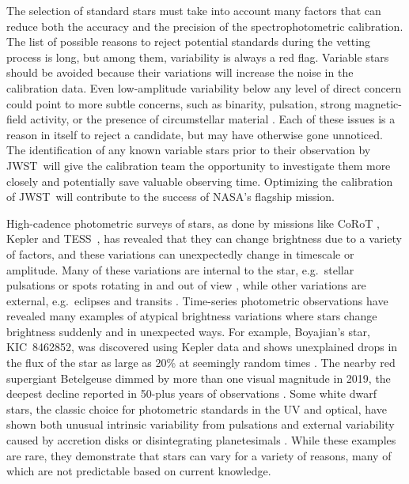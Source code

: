 \documentclass[twocolumn]{aastex631}
\newcommand{\webb}{JWST}
\newcommand{\tess}{TESS}
\begin{document}
The selection of standard stars must take into account many factors that can reduce both the accuracy and the precision of the spectrophotometric calibration.  The list of possible reasons to reject potential standards during the vetting process is long, but among them, variability is always a red flag.  Variable stars should be avoided because their variations will increase the noise in the calibration data.  Even low-amplitude variability below any level of direct concern could point to more subtle concerns, such as binarity, pulsation, strong magnetic-field activity, or the presence of circumstellar material \citep{Bohlin2014PASP126}. Each of these issues is a reason in itself to reject a candidate, but may have otherwise gone unnoticed.  The identification of any known variable stars prior to their observation by \webb\ will give the calibration team the opportunity to investigate them more closely and potentially save valuable observing time.  Optimizing the calibration of \webb\ will contribute to the success of NASA's flagship mission.

High-cadence photometric surveys of stars, as done by missions like CoRoT \citep{corot}, Kepler \citep{Koch2010} and \tess\ \citep{Ricker2015}, has revealed that they can change brightness due to a variety of factors, and these variations can unexpectedly change in timescale or amplitude. Many of these variations are internal to the star, e.g.\ stellar pulsations or spots rotating in and out of view \citep[e.g.][]{Berger1979deltaScuti, Mcquillan2014}, while other variations are external, e.g.\ eclipses and transits \citep[e.g.][]{prsa2011, Thompson2018}. Time-series photometric observations have revealed many examples of atypical brightness variations where stars change brightness suddenly and in unexpected ways.  For example, Boyajian's star, KIC~8462852, was discovered using Kepler data and shows unexplained drops in the flux of the star as large as 20\% at seemingly random times \citep{Boyajian2016MNRAS}.  The nearby red supergiant Betelgeuse dimmed by more than one visual magnitude in 2019, the deepest decline reported in 50-plus years of observations \citep{Betelgeuse2021Natur594,Cotton2020RNAAS4}.  Some white dwarf stars, the classic choice for photometric standards in the UV and optical, have shown both unusual intrinsic variability from pulsations \citep[e.g.][]{Provencal2009ApJGD358,Kilic2015ApJ,Hermes2017MNRAS} and external variability caused by accretion disks \citep{Scaringi2021Nat} or disintegrating planetesimals \citep[as large as 40\%;][]{Vanderburg2015Natur,Guidry2021}.  While these examples are rare, they demonstrate that stars can vary for a variety of reasons, many of which are not predictable based on current knowledge.  
\end{document}
